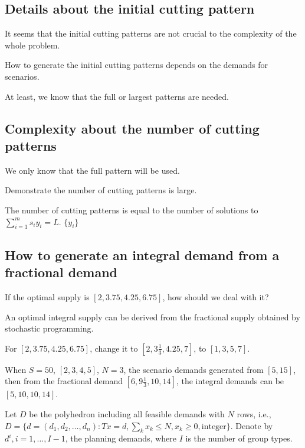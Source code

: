\subsection{Details about the initial cutting pattern}
It seems that the initial cutting patterns are not crucial to the complexity of the whole problem.

How to generate the initial cutting patterns depends on the demands for scenarios.

At least, we know that the full or largest patterns are needed.

\subsection{Complexity about the number of cutting patterns}
We only know that the full pattern will be used.

Demonstrate the number of cutting patterns is large.

The number of cutting patterns is equal to the number of solutions to $\sum_{i=1}^m s_i y_i = L$. $\{y_i\}$

\subsection{How to generate an integral demand from a fractional demand}


If the optimal supply is $[2, 3.75, 4.25, 6.75]$, how should we deal with it?

\begin{thm}
An optimal integral supply can be derived from the fractional supply obtained by stochastic programming.
\end{thm}


For $[2, 3.75, 4.25, 6.75]$, change it to $[2, 3\frac{1}{3}, 4.25, 7]$, to $[1, 3, 5, 7]$.

When $S = 50$, $[2,3,4,5]$, $N =3$, the scenario demands generated from $[5,15]$, then from the fractional demand $[6, 9\frac{1}{3}, 10, 14]$, the integral demands can be $[5, 10, 10, 14]$. 

Let $D$ be the polyhedron including all feasible demands with $N$ rows, i.e., $D = \{d = (d_1,d_2,\ldots, d_n): Tx = d,\sum_{k} x_k \leq N, x_k \geq 0, \mbox{integer} \}$.
Denote by $d^{i}, i = 1,\ldots, I-1$, the planning demands, where $I$ is the number of group types.

